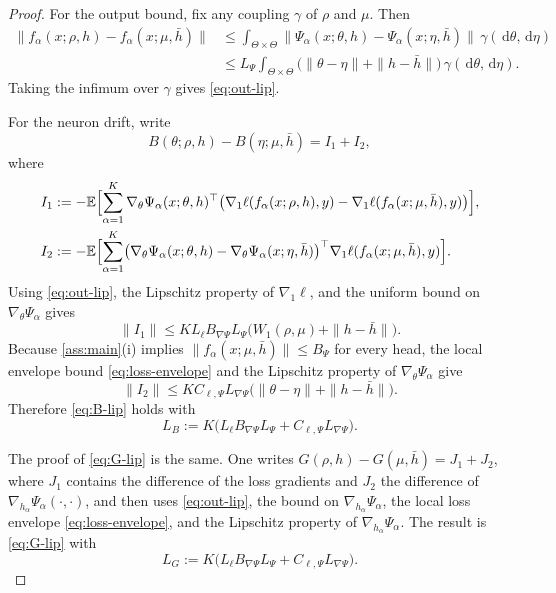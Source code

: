 \documentclass[11pt]{article}
\theoremstyle{definition}
\newcommand{\E}{\mathbb{E}}
\newcommand{\W}{W_1}
\newcommand{\dd}{\,\mathrm{d}}
\begin{document}
\begin{proof}
For the output bound, fix any coupling $\gamma$ of $\rho$ and $\mu$. Then
\begin{align*}
  \|f_\alpha(x;\rho,h)-f_\alpha(x;\mu,\bar h)\|
  &\le
  \int_{\Theta\times\Theta}
  \|\Psi_\alpha(x;\theta,h)-\Psi_\alpha(x;\eta,\bar h)\|
  \,\gamma(\dd\theta,\dd\eta)\\
  &\le
  L_\Psi
  \int_{\Theta\times\Theta}
  \bigl(\|\theta-\eta\|+\|h-\bar h\|\bigr)\,\gamma(\dd\theta,\dd\eta).
\end{align*}
Taking the infimum over $\gamma$ gives \eqref{eq:out-lip}.

For the neuron drift, write
\[
  B(\theta;\rho,h)-B(\eta;\mu,\bar h)=I_1+I_2,
\]
where
\begin{align*}
  I_1
  &:=
  -\E\Bigl[
    \sum_{\alpha=1}^K
    \nabla_\theta\Psi_\alpha(x;\theta,h)^\top
    \bigl(
      \nabla_1\ell(f_\alpha(x;\rho,h),y)
      -
      \nabla_1\ell(f_\alpha(x;\mu,\bar h),y)
    \bigr)
  \Bigr],\\
  I_2
  &:=
  -\E\Bigl[
    \sum_{\alpha=1}^K
    \bigl(
      \nabla_\theta\Psi_\alpha(x;\theta,h)
      -
      \nabla_\theta\Psi_\alpha(x;\eta,\bar h)
    \bigr)^\top
    \nabla_1\ell(f_\alpha(x;\mu,\bar h),y)
  \Bigr].
\end{align*}
Using \eqref{eq:out-lip}, the Lipschitz property of $\nabla_1\ell$, and the
uniform bound on $\nabla_\theta\Psi_\alpha$ gives
\[
  \|I_1\|
  \le
  K L_\ell B_{\nabla\Psi}L_\Psi
  \bigl(\W(\rho,\mu)+\|h-\bar h\|\bigr).
\]
Because \cref{ass:main}(i) implies
\(
  \|f_\alpha(x;\mu,\bar h)\|\le B_\Psi
\)
for every head, the local envelope bound \eqref{eq:loss-envelope} and the
Lipschitz property of $\nabla_\theta\Psi_\alpha$ give
\[
  \|I_2\|
  \le
  K C_{\ell,\Psi} L_{\nabla\Psi}
  \bigl(\|\theta-\eta\|+\|h-\bar h\|\bigr).
\]
Therefore \eqref{eq:B-lip} holds with
\[
  L_B:=K\bigl(L_\ell B_{\nabla\Psi}L_\Psi+C_{\ell,\Psi} L_{\nabla\Psi}\bigr).
\]

The proof of \eqref{eq:G-lip} is the same. One writes
$G(\rho,h)-G(\mu,\bar h)=J_1+J_2$, where $J_1$ contains the difference of the
loss gradients and $J_2$ the difference of
$\nabla_{h_\alpha}\Psi_\alpha(\cdot,\cdot)$, and then uses \eqref{eq:out-lip},
the bound on $\nabla_{h_\alpha}\Psi_\alpha$, the local loss envelope
\eqref{eq:loss-envelope}, and the Lipschitz property of
$\nabla_{h_\alpha}\Psi_\alpha$. The result is \eqref{eq:G-lip} with
\[
  L_G:=K\bigl(L_\ell B_{\nabla\Psi}L_\Psi+C_{\ell,\Psi} L_{\nabla\Psi}\bigr).
\]
\end{proof}
\end{document}
